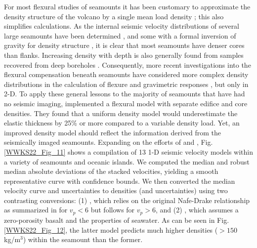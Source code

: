 For most flexural studies of seamounts it has been customary to approximate the density structure of the
volcano by a single mean load density \citep[e.g.,~][]{WC74,WSSW06}; this also simplifies calculations.
As the internal seismic velocity distributions of several large seamounts have been determined \citep[e.g.,~][]{W1985,H1994,C1995,W1997,C1999,W1999,G2001,K2002,EMH05,C2009,W2021},
and some with a formal inversion of gravity for density structure \citep[e.g.,~][]{H1991}, it is clear that most seamounts have denser
cores than flanks.  Increasing density with depth is also generally found from samples recovered from deep boreholes
\citep[e.g.,~][]{JM2001,H1979}.
Consequently, more recent investigations into the flexural compensation beneath seamounts have considered more complex
density distributions in the calculation of flexure and gravimetric responses \citep[e.g.,~][]{C2009,W2021}, but only in 2-D. To apply
these general lessons to the majority of seamounts that have had no seismic imaging, \citet{KW2010} implemented a flexural
model with separate edifice and core densities. They found that a uniform density model would underestimate the elastic thickness
by 25\% or more compared to a variable density load.  Yet, an improved density model should reflect the information derived
from the seismically imaged seamounts.  Expanding on the efforts of \citet{M2001} and \citet{W2021}, Fig. \ref{WWKS22_Fig_11}
shows a compilation of 13 1-D seismic velocity models within a variety of seamounts and oceanic islands.  We computed
the median and robust median absolute deviations of the stacked velocities, yielding a smooth representative curve with confidence bounds.
We then converted the median velocity curve and uncertainties to densities (and uncertainties) using two contrasting conversions:
(1) \citet{B2005}, which relies on the original Nafe-Drake relationship as summarized in \citet{LND70}
for $v_p < 6$ but follows \citet{CM1995} for $v_p >6$, and (2) \citet{CR1984}, which assumes a zero-porosity basalt and the properties of seawater.
As can be seen in Fig. \ref{WWKS22_Fig_12}, the latter model predicts much higher densities ($> 150$ kg/m$^3$) within the seamount
than the former.

